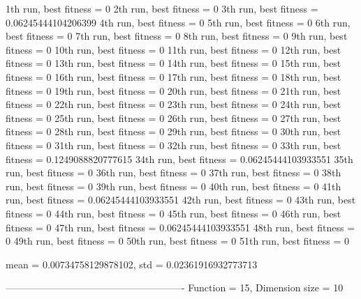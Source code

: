 1th run, best fitness = 0
2th run, best fitness = 0
3th run, best fitness = 0.06245444104206399
4th run, best fitness = 0
5th run, best fitness = 0
6th run, best fitness = 0
7th run, best fitness = 0
8th run, best fitness = 0
9th run, best fitness = 0
10th run, best fitness = 0
11th run, best fitness = 0
12th run, best fitness = 0
13th run, best fitness = 0
14th run, best fitness = 0
15th run, best fitness = 0
16th run, best fitness = 0
17th run, best fitness = 0
18th run, best fitness = 0
19th run, best fitness = 0
20th run, best fitness = 0
21th run, best fitness = 0
22th run, best fitness = 0
23th run, best fitness = 0
24th run, best fitness = 0
25th run, best fitness = 0
26th run, best fitness = 0
27th run, best fitness = 0
28th run, best fitness = 0
29th run, best fitness = 0
30th run, best fitness = 0
31th run, best fitness = 0
32th run, best fitness = 0
33th run, best fitness = 0.1249088820777615
34th run, best fitness = 0.06245444103933551
35th run, best fitness = 0
36th run, best fitness = 0
37th run, best fitness = 0
38th run, best fitness = 0
39th run, best fitness = 0
40th run, best fitness = 0
41th run, best fitness = 0.06245444103933551
42th run, best fitness = 0
43th run, best fitness = 0
44th run, best fitness = 0
45th run, best fitness = 0
46th run, best fitness = 0
47th run, best fitness = 0.06245444103933551
48th run, best fitness = 0
49th run, best fitness = 0
50th run, best fitness = 0
51th run, best fitness = 0

mean = 0.00734758129878102, std = 0.02361916932773713

-------------------------------------------------------
Function = 15, Dimension size = 10

